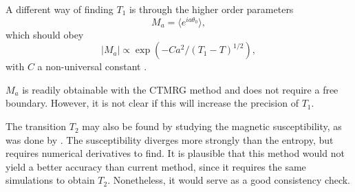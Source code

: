 A different way of finding $T_1$ is through the higher order parameters
\begin{equation}
  M_a = \langle e^{i a \theta_0 } \rangle,
\end{equation}
which should obey
\begin{equation}
  |M_a| \propto \exp \left(-Ca^2 / (T_1 - T)^{1/2} \right),
\end{equation}
with $C$ a non-universal constant \cite{cardy1980general}.

$M_a$ is readily obtainable with the CTMRG method and does not require a free boundary.
However, it is not clear if this will increase the precision of $T_1$.

The transition $T_2$ may also be found by studying the magnetic susceptibility,
as was done by \cite{borisenko2011numerical}.
The susceptibility diverges more strongly than the entropy, but requires numerical derivatives to find.
It is plausible that this method would not yield a better accuracy than current method,
since it requires the same simulations to obtain $T_2$. Nonetheless, it would serve as a good consistency check.
